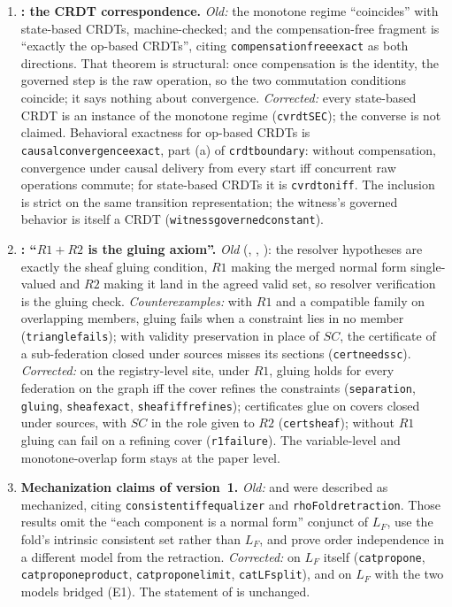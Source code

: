 \documentclass[11pt,a4paper]{article}
\theoremstyle{plain}
\theoremstyle{definition}
\theoremstyle{remark}
\renewcommand{\_}{\origunderscore\allowbreak}
\begin{document}
\begin{enumerate}[leftmargin=*, label=\textbf{E\arabic*.}]
\item \textbf{: the CRDT correspondence.}
  \emph{Old:} the monotone regime ``coincides'' with state-based CRDTs, machine-checked; and the
  compensation-free fragment is ``exactly the op-based CRDTs'', citing
  \texttt{compensation\_free\_exact} as both directions. That theorem is structural: once
  compensation is the identity, the governed step is the raw operation, so the two commutation
  conditions coincide; it says nothing about convergence.
  \emph{Corrected:} every state-based CRDT is an instance of the monotone regime (\texttt{cvrdt\_SEC});
  the converse is not claimed. Behavioral exactness for op-based CRDTs is
  \texttt{causal\_convergence\_exact}, part (a) of \texttt{crdt\_boundary}: without compensation,
  convergence under causal delivery from every start iff concurrent raw operations commute; for
  state-based CRDTs it is \texttt{cvrdt\_on\_iff}. The inclusion is strict on the same transition
  representation; the witness's governed behavior is itself a CRDT
  (\texttt{witness\_governed\_constant}).

\item \textbf{: ``$R1 + R2$ is the gluing axiom''.}
  \emph{Old} (, , ): the resolver hypotheses
  are exactly the sheaf gluing condition, $R1$ making the merged normal form single-valued and $R2$
  making it land in the agreed valid set, so resolver verification is the gluing check.
  \emph{Counterexamples:} with $R1$ and a compatible family on overlapping members, gluing fails when a
  constraint lies in no member (\texttt{triangle\_fails}); with validity preservation in place of
  $SC$, the certificate of a sub-federation closed under sources misses its sections
  (\texttt{cert\_needs\_sc}). \emph{Corrected:} on the registry-level site, under $R1$, gluing holds
  for every federation on the graph iff the cover refines the constraints (\texttt{separation},
  \texttt{gluing}, \texttt{sheaf\_exact}, \texttt{sheaf\_iff\_refines}); certificates glue on covers
  closed under sources, with $SC$ in the role given to $R2$ (\texttt{cert\_sheaf}); without $R1$
  gluing can fail on a refining cover (\texttt{r1\_failure}). The variable-level and monotone-overlap
  form stays at the paper level.

\item \textbf{Mechanization claims of version~1.}
  \emph{Old:}  and  were described as mechanized, citing
  \texttt{consistent\_iff\_equalizer} and \texttt{rhoFold\_retraction}. Those results omit the
  ``each component is a normal form'' conjunct of $L_F$, use the fold's intrinsic consistent set rather
  than $L_F$, and prove order independence in a different model from the retraction.
  \emph{Corrected:}  on $L_F$ itself (\texttt{cat\_prop\_one},
  \texttt{cat\_prop\_one\_product}, \texttt{cat\_prop\_one\_limit}, \texttt{cat\_LF\_split}), and
   on $L_F$ with the two models bridged (E1). The statement of  is
  unchanged.
\end{enumerate}
\end{document}
